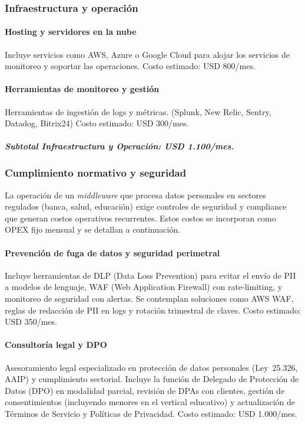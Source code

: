 \subsubsection{Infraestructura y operación}

\paragraph{Hosting y servidores en la nube}
Incluye servicios como AWS, Azure o Google Cloud para alojar los servicios de monitoreo y soportar las operaciones.
Costo estimado: USD 800/mes.

\paragraph{Herramientas de monitoreo y gestión}
Herramientas de ingestión de logs y métricas. (Splunk, New Relic, Sentry, Datadog, Bitrix24)
Costo estimado: USD 300/mes.


\subparagraph{Subtotal Infraestructura y Operación: USD 1.100/mes.}

\subsubsection{Cumplimiento normativo y seguridad}

La operación de un \textit{middleware} que procesa datos personales en sectores regulados (banca, salud, educación) exige controles de seguridad y compliance que generan costos operativos recurrentes. Estos costos se incorporan como OPEX fijo mensual y se detallan a continuación.

\paragraph{Prevención de fuga de datos y seguridad perimetral}
Incluye herramientas de DLP (Data Loss Prevention) para evitar el envío de PII a modelos de lenguaje, WAF (Web Application Firewall) con rate-limiting, y monitoreo de seguridad con alertas. Se contemplan soluciones como AWS WAF, reglas de redacción de PII en logs y rotación trimestral de claves.
Costo estimado: USD 350/mes.

\paragraph{Consultoría legal y DPO}
Asesoramiento legal especializado en protección de datos personales (Ley~25.326, AAIP) y cumplimiento sectorial. Incluye la función de Delegado de Protección de Datos (DPO) en modalidad parcial, revisión de DPAs con clientes, gestión de consentimientos (incluyendo menores en el vertical educativo) y actualización de Términos de Servicio y Políticas de Privacidad.
Costo estimado: USD 1.000/mes.

